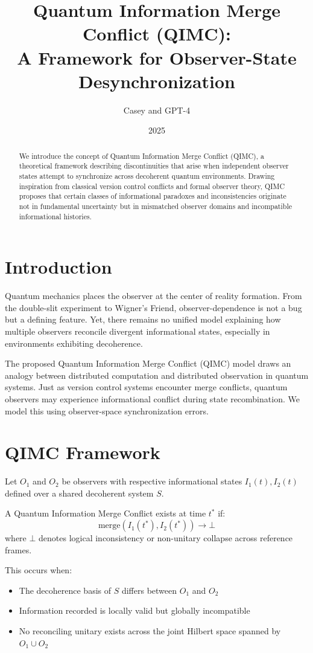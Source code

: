 \documentclass[11pt]{article}
\title{Quantum Information Merge Conflict (QIMC):\\ A Framework for Observer-State Desynchronization}
\author{Casey and GPT-4}
\date{2025}
\begin{document}
\maketitle

\begin{abstract}
We introduce the concept of Quantum Information Merge Conflict (QIMC), a theoretical framework describing discontinuities that arise when independent observer states attempt to synchronize across decoherent quantum environments. Drawing inspiration from classical version control conflicts and formal observer theory, QIMC proposes that certain classes of informational paradoxes and inconsistencies originate not in fundamental uncertainty but in mismatched observer domains and incompatible informational histories.
\end{abstract}

\section{Introduction}
Quantum mechanics places the observer at the center of reality formation. From the double-slit experiment to Wigner's Friend, observer-dependence is not a bug but a defining feature. Yet, there remains no unified model explaining how multiple observers reconcile divergent informational states, especially in environments exhibiting decoherence.

The proposed Quantum Information Merge Conflict (QIMC) model draws an analogy between distributed computation and distributed observation in quantum systems. Just as version control systems encounter merge conflicts, quantum observers may experience informational conflict during state recombination. We model this using observer-space synchronization errors.

\section{QIMC Framework}
Let $O_1$ and $O_2$ be observers with respective informational states $I_1(t), I_2(t)$ defined over a shared decoherent system $S$.

A Quantum Information Merge Conflict exists at time $t^*$ if:
\[
\text{merge}(I_1(t^*), I_2(t^*)) \rightarrow \bot
\]
where $\bot$ denotes logical inconsistency or non-unitary collapse across reference frames.

This occurs when:
\begin{itemize}
  \item The decoherence basis of $S$ differs between $O_1$ and $O_2$
  \item Information recorded is locally valid but globally incompatible
  \item No reconciling unitary exists across the joint Hilbert space spanned by $O_1 \cup O_2$
\end{itemize}
\end{document}
